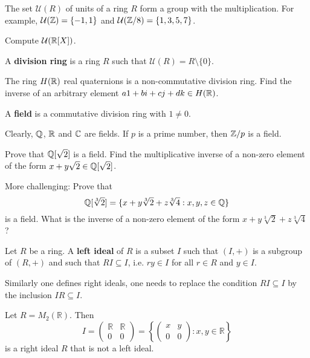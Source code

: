 The set $\mathcal{U}(R)$ of units of a ring $R$ form 
a group with the multiplication. For example, $\mathcal{U}(\mathbb{Z})=\{-1,1\}$ and 
$\mathcal{U}(\mathbb{Z}/8)=\{1,3,5,7\}$. 

\begin{exercise}
Compute $\mathcal{U}(\mathbb{R}[X])$.
\end{exercise}

\begin{definition}
	A \textbf{division ring} is a ring $R$ 
	such that $\mathcal{U}(R)=R\setminus\{0\}$.  	
\end{definition}

The ring $H(\mathbb{R})$ real quaternions is a non-commutative division ring. Find the inverse of
an arbitrary element $a1+bi+cj+dk\in H(\mathbb{R})$. 

\begin{definition}
	A \textbf{field} is a commutative division ring with $1\ne 0$. 
\end{definition}

Clearly, $\mathbb{Q}$, $\mathbb{R}$ and $\mathbb{C}$ are fields. 
If $p$ is a prime number, then $\mathbb{Z}/p$ is a field. 	

\begin{exercise}
	Prove that $\mathbb{Q}[\sqrt{2}]$ is a field. 
	Find the multiplicative inverse of a non-zero element of the form 
	$x+y\sqrt{2}\in\mathbb{Q}[\sqrt{2}]$.  
\end{exercise}

More challenging: Prove that 
\[
\mathbb{Q}[\sqrt[3]{2}]=\{x+y\sqrt[3]{2}+z\sqrt[3]{4}:x,y,z\in\mathbb{Q}\}
\]
is a field. What is the inverse of a non-zero element of the form $x+y\sqrt[3]{2}+z\sqrt[3]{4}$?


\begin{definition}
	Let $R$ be a ring. A \textbf{left ideal} of $R$ is a subset $I$ such that 
	$(I,+)$ is a subgroup of $(R,+)$ and such that $RI\subseteq I$, 
	i.e. $ry\in I$ for all $r\in R$ and $y\in I$. 
\end{definition}

Similarly one defines right ideals, one needs 
to replace the condition $RI\subseteq I$ by 
the inclusion 
$IR\subseteq I$. 

\begin{example}
Let $R=M_{2}(\mathbb{R})$. Then   
\[
I=\left(\begin{array}{cc}
\mathbb{R} & \mathbb{R}\\
0 & 0
\end{array}\right)=\left\{ \left(\begin{array}{cc}
x & y\\
0 & 0
\end{array}\right):x,y\in\mathbb{R}\right\} 
\]
is a right ideal $R$ that is not a left ideal. 
\end{example}

